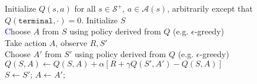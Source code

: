 \documentclass{standalone}
\begin{document}
\pagestyle{empty}
\begin{algorithm}[H]
  Initialize $Q(s,a)$ for all $s \in \mathcal S^+$, $a \in \mathcal A(s)$,   arbitrarily except that $Q(\texttt{terminal}, \cdot) = 0$.
 {
  Initialize $S$ \\
  \textcolor{blue}Choose $A$ from $S$ using policy derived from $Q$ (e.g. $\epsilon$-greedy) \\
   {
    Take action $A$, observe $R, S'$ \\
    Choose $A'$ from $S'$ using policy derived from $Q$ (e.g. $\epsilon$-greedy)         \\
    $Q(S, A) \gets Q(S, A) + \alpha \left[R + \gamma Q(S', A') - Q(S, A)\right]$     \\
    $S \gets S'$; $A \gets A'$;
  }
}
\end{algorithm}
\end{document}
